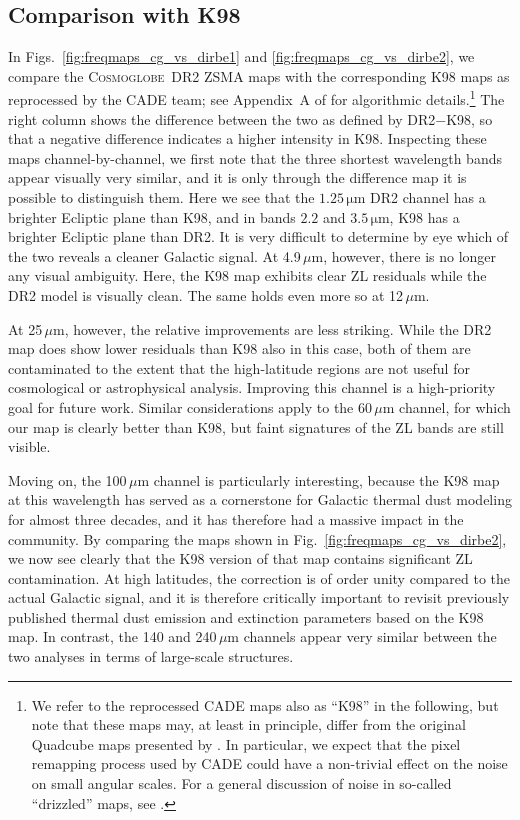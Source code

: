 \documentclass{aa}
\newcommand{\cosmoglobe}{\textsc{Cosmoglobe}}
\begin{document}
\subsection{Comparison with K98}

In Figs.~\ref{fig:freqmaps_cg_vs_dirbe1} and
\ref{fig:freqmaps_cg_vs_dirbe2}, we compare the \cosmoglobe\ DR2 ZSMA
maps with the corresponding K98 maps as reprocessed by the CADE team;
see Appendix~A of \citet{paradis:2012} for algorithmic
details.\footnote{We refer to the reprocessed CADE maps also as
``K98'' in the following, but note that these maps may, at least in
principle, differ from the original Quadcube maps presented by
\citet{kelsall1998}. In particular, we expect that the pixel remapping
process used by CADE could have a non-trivial effect on the noise on
small angular scales. For a general discussion of noise in so-called
``drizzled'' maps, see \citet{Fruchter_2002}.} The right column shows
the difference between the two as defined by DR2$-$K98, so that a negative
difference indicates a higher intensity in K98. Inspecting these
maps channel-by-channel, we first note that the three shortest
wavelength bands appear visually very similar, and it is only through
the difference map it is possible to distinguish them. Here we see
that {the $1.25\,\mathrm{\mu m}$ DR2 channel has a brighter Ecliptic plane
than K98, and in bands $2.2$ and $3.5\,\mathrm{\mu m}$,} K98 has a brighter Ecliptic plane than DR2.
It is very
difficult to determine by eye which of the two reveals a cleaner
Galactic signal. At 4.9$\,\mu$m, however, there is no longer any
visual ambiguity. Here, the K98 map exhibits
clear ZL residuals while the DR2 model is visually clean. The
same holds even more so at 12$\,\mu$m.

At 25$\,\mu$m, however, the relative improvements are less
striking. While the DR2 map does show lower residuals than K98 also in
this case, both of them  are contaminated to the extent that
the high-latitude regions are not useful for cosmological or
astrophysical analysis. Improving this channel is a
high-priority goal for future work. Similar considerations apply to
the 60\,$\mu$m channel, for which our map is clearly better than K98,
but faint signatures of the ZL bands are still visible.

Moving on, the 100\,$\mu$m channel is particularly interesting,
because the K98 map at this wavelength has served as a cornerstone for
Galactic thermal dust modeling for almost three decades, and it has
therefore had a massive impact in the community. By comparing the maps
shown in Fig.~\ref{fig:freqmaps_cg_vs_dirbe2}, we now see clearly that
the K98 version of that map contains significant ZL contamination. At
high latitudes, the correction is of order unity compared to the
actual Galactic signal, and it is therefore critically important to
revisit previously published thermal dust emission and extinction
parameters based on the K98 map. In contrast, the 140 and 240$\,\mu$m
channels appear very similar between the two analyses in terms of
large-scale structures.
\end{document}
